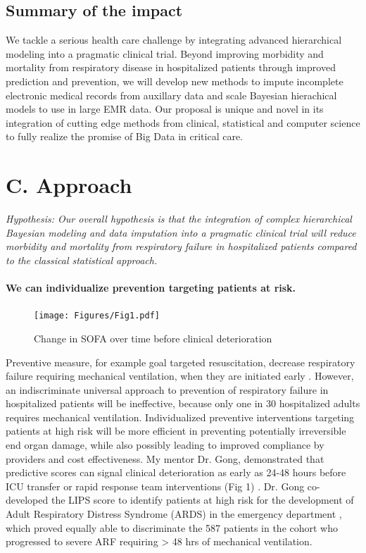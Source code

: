 \documentclass[11pt,notitlepage]{article}
\begin{document}
\subsection*{Summary of the impact}
We tackle a serious health care challenge by integrating advanced hierarchical modeling into a pragmatic clinical trial. Beyond improving morbidity and mortality from respiratory disease in hospitalized patients through improved prediction and prevention, we will develop new methods to impute incomplete electronic medical records from auxillary data and scale Bayesian hierachical models to use in large EMR data. Our proposal is unique and novel in its integration of cutting edge methods from clinical, statistical and computer science to fully realize the promise of Big Data in critical care.

\section*{C. Approach}
\begin{flushleft}
\textit{Hypothesis: Our overall hypothesis is that the integration of complex hierarchical Bayesian modeling and data imputation into a pragmatic clinical trial will reduce morbidity and mortality from respiratory failure in hospitalized patients compared to the classical statistical approach.}
\end{flushleft}

\paragraph*{We can individualize prevention targeting patients at risk.}

\begin{figure} %
\texttt{[image: Figures/Fig1.pdf]}
\caption{\footnotesize Change in SOFA over time before clinical deterioration}
\end{figure}

Preventive measure, for example goal targeted resuscitation, decrease respiratory failure requiring mechanical ventilation, when they are initiated early \cite{Rivers_12594312}. However, an indiscriminate universal approach to prevention of respiratory failure in hospitalized patients will be ineffective, because only one in 30 hospitalized adults requires mechanical ventilation. Individualized preventive interventions targeting patients at high risk will be more efficient in preventing potentially irreversible end organ damage, while also possibly leading to improved compliance by providers and cost effectiveness. My mentor Dr. Gong, demonstrated that predictive scores can signal clinical deterioration as early as 24-48 hours before ICU transfer or rapid response team interventions (Fig 1) \cite{Yu_24970344}. Dr. Gong co-developed the LIPS score to identify patients at high risk for the development of Adult Respiratory Distress Syndrome (ARDS) in the emergency department \cite{Herridge_12594312}, which proved equally able to discriminate the 587 patients in the cohort who progressed to severe ARF requiring > 48 hrs of mechanical ventilation.  
\end{document}
